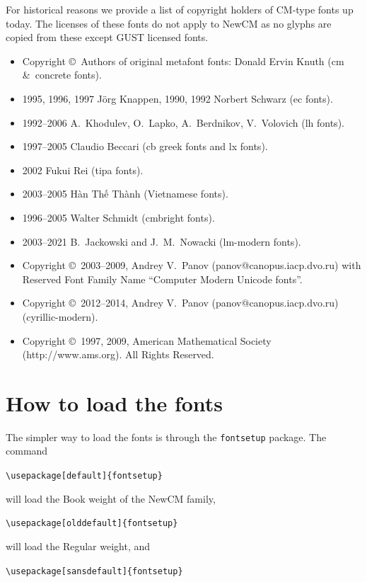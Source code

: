 \documentclass{article}
\newcommand{\ctosc}[1]{{\ctoscseries#1}}
\begin{document}
For historical reasons we provide a list of copyright holders
of \ctosc{CM}-type fonts up today. The licenses of these fonts do not apply to NewCM
as no glyphs are copied from these except \ctosc{GUST} licensed fonts.
\begin{itemize}
\item Copyright \copyright\ Authors of original metafont fonts: Donald Ervin Knuth (cm \&\ concrete fonts).
\item \textsc{1995, 1996, 1997} J\"org Knappen, \textsc{1990, 1992} Norbert Schwarz (ec fonts).
\item \textsc{1992--2006} A.~Khodulev, O.~Lapko, A.~Berdnikov, V.~Volovich (lh fonts).
\item \textsc{1997--2005} Claudio Beccari (cb greek fonts and lx fonts).
\item \textsc{2002} Fukui Rei (tipa fonts).
\item \textsc{2003--2005} Hàn Thế Thành (Vietnamese fonts).
\item \textsc{1996--2005} Walter Schmidt (cmbright fonts).
 \item \textsc{2003--2021} B.~Jackowski and J.~M.~Nowacki (lm-modern fonts).
\item Copyright \copyright\  \textsc{2003--2009}, Andrey V.~Panov (panov@canopus.iacp.dvo.ru) with Reserved Font Family Name ``Computer Modern Unicode fonts''.
\item Copyright \copyright\ \textsc{2012--2014}, Andrey V.~Panov (panov@canopus.iacp.dvo.ru) (cyrillic-modern).
\item Copyright \copyright\ \textsc{1997, 2009}, American Mathematical Society (http://www.ams.org).
All Rights Reserved.
\end{itemize}





\section{How to load the fonts}
The simpler way to load the fonts is through the \verb|fontsetup| package. The command

\verb|\usepackage[default]{fontsetup}|

\noindent will load the Book weight of the NewCM family, 

\verb|\usepackage[olddefault]{fontsetup}|

\noindent will load the Regular weight, and

\verb|\usepackage[sansdefault]{fontsetup}|
\end{document}
